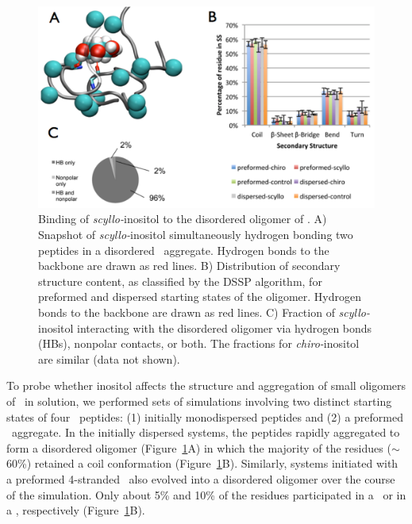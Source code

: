 \begin{figure}[htbp]
  \centering
  \includegraphics[width=6in]{figures/results1/GA4_paper_figures_submitted-4-rearranged}
  \caption[Binding of \textit{scyllo-}inositol to the disordered oligomer of \gafour.]{Binding of \textit{scyllo-}inositol to the disordered oligomer of \gafour. A) Snapshot of \textit{scyllo-}inositol simultaneously hydrogen bonding two peptides in a disordered \gafour\ aggregate. Hydrogen bonds to the backbone are drawn as red lines. B) Distribution of secondary structure content, as classified by the DSSP algorithm, for preformed and dispersed starting states of the oligomer. Hydrogen bonds to the backbone are drawn as red lines. C) Fraction of \textit{scyllo-}inositol interacting with the disordered oligomer via hydrogen bonds (HBs), nonpolar contacts, or both. The fractions for \textit{chiro-}inositol are similar (data not shown).}
   \label{fig:figure4}
\end{figure}

To probe whether inositol affects the structure and aggregation of small oligomers of \gafour\ in solution, we performed sets of simulations involving two distinct starting states of four \gafour\ peptides: (1) initially monodispersed peptides and (2) a preformed \bsheet\ aggregate. In the initially dispersed systems, the peptides rapidly aggregated to form a disordered oligomer (Figure~\ref{fig:figure4}A) in which the majority of the residues ($\sim$60\%) retained a coil conformation (Figure~\ref{fig:figure4}B). Similarly, systems initiated with a preformed 4-stranded \bsheet\ also evolved into a disordered oligomer over the course of the simulation. Only about 5\% and 10\% of the residues participated in a \bsheet\ or in a \bbridge, respectively (Figure~\ref{fig:figure4}B).
	
